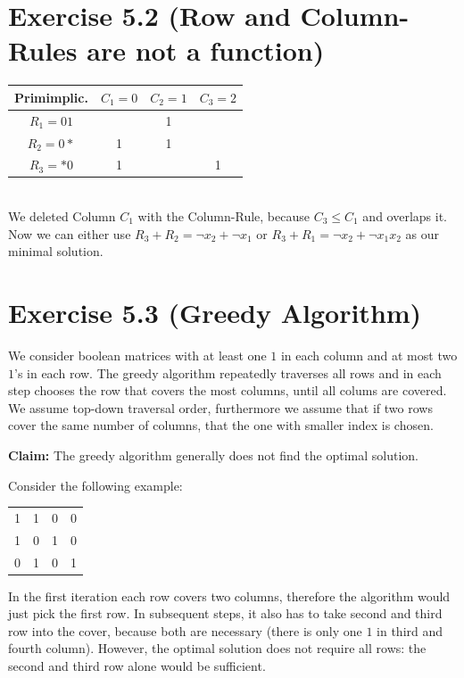 \documentclass[10pt,a4paper]{scrartcl}
\newcommand{\subExercise}[1]{\vspace{0.5em} \noindent{\bf #1)}}
\begin{document}
\FloatBarrier
\newpage
\section*{Exercise 5.2 (Row and Column-Rules are not a function)}
\begin{tabular}{|c||c|c|c|}
  \hline
Primimplic.       & \cellcolor{gray}$C_1=0$  & $C_2=1$   & $C_3=2$           \\ \hline\hline
$R_1 = 01$     & \cellcolor{gray}         & 1         &                   \\ \hline
$R_2 = 0\ast$  & \cellcolor{gray}1        & 1         &                   \\ \hline
$R_3 = \ast 0$ & \cellcolor{gray}1        &           & 1                 \\
  \hline
\end{tabular}\\
We deleted Column $C_1$ with the Column-Rule, because $C_3 \leq C_1$ and overlaps it. Now we can either use $R_3+R_2 = \neg x_2+\neg x_1$ or $R_3+R_1 = \neg x_2 + \neg x_1x_2$
as our minimal solution.

\FloatBarrier
\section*{Exercise 5.3 (Greedy Algorithm)}
We consider boolean matrices with at least one $1$ in each column and 
at most two $1$'s in each row. 
The greedy algorithm repeatedly traverses all rows
and in each step chooses the row that covers the most columns, until all
colums are covered.
 We assume top-down traversal order, furthermore we assume that if two rows
cover the same number of columns, that the one with smaller index is chosen.

\subExercise{a} {\textbf{Claim:}} The greedy algorithm generally does not find the
optimal solution.

 Consider the following example:

\vspace{0.5em}
\begin{tabular}{|c c c c|}
\hline
1 & 1 & 0 & 0 \\
1 & 0 & 1 & 0 \\
0 & 1 & 0 & 1 \\
\hline
\end{tabular}

In the first iteration each row covers two columns, therefore the algorithm would just pick the first row.
In subsequent steps, it also has to take second and third row into the cover, because both are necessary (there is only one $1$ in third and fourth column). However, the optimal solution does not require all rows: the second and third row alone would be sufficient.
\end{document}
